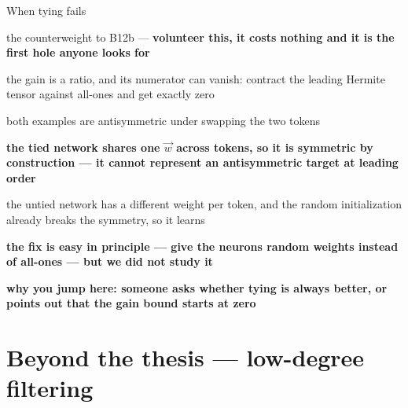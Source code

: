 \documentclass[aspectratio=169,11pt]{beamer}
\begin{document}
\begin{frame}{When tying fails}
{\begin{notelist}
    \item the counterweight to B12b --- \textbf{volunteer this, it costs
      nothing and it is the first hole anyone looks for}
    \item the gain is a ratio, and its numerator can vanish: contract the
      leading Hermite tensor against all-ones and get exactly zero
    \item both examples are antisymmetric under swapping the two tokens
    \item \textbf{the tied network shares one $\vec{w}$ across tokens, so it is
      symmetric by construction --- it cannot represent an antisymmetric
      target at leading order}
    \item the untied network has a different weight per token, and the random
      initialization already breaks the symmetry, so it learns
    \item \textbf{the fix is easy in principle --- give the neurons random
      weights instead of all-ones --- but we did not study it}
    \item \textbf{why you jump here: someone asks whether tying is always
      better, or points out that the gain bound starts at zero}
  \end{notelist}}
\end{frame}

\section{Beyond the thesis --- low-degree filtering}
\end{document}
